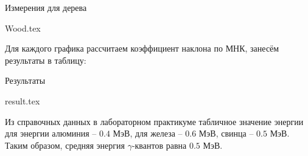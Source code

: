 \begin{table}[h!]
  \centering
  \caption{Измерения для дерева}
  {Wood.tex}
\end{table}


Для каждого графика рассчитаем коэффициент наклона по МНК, занесём результаты в
таблицу:

\newpage

\begin{table}[h!]
  \centering
  \caption{Результаты}
  {result.tex}
\end{table}

Из справочных данных в лабораторном практикуме табличное значение энергии для
энергии алюминия -- $0.4$ МэВ, для железа -- $0.6$ МэВ, свинца -- $0.5$ МэВ.
Таким образом, средняя энергия $\gamma$-квантов равна $0.5$ МэВ.
